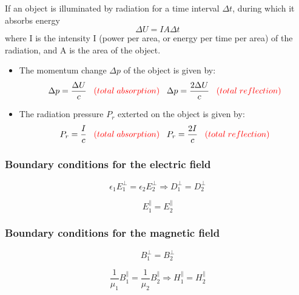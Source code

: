 \documentclass[english,11pt]{article}
\begin{document}
If an object is illuminated by radiation for a time interval ${\Delta}t$,
during which it absorbs energy
\begin{equation*}
  {\Delta}U = IA{\Delta}t
\end{equation*}
where I is the intensity I (power per area, or energy per time
per area) of the radiation, and A is the area of the object.
\begin{itemize}
\item
The momentum change ${\Delta}p$ of the object is given by:
\begin{equation*}
    {\Delta}p = \frac{{\Delta}U}{c}
    \;\;\; {\color{red} \small (total \; absorption)}
    \;\;\;
    {\Delta}p = \frac{2{\Delta}U}{c}
    \;\;\; {\color{red} \small (total \; reflection)}
\end{equation*}
\item
The radiation pressure $P_r$ exterted on the object is given by:
\begin{equation*}
  P_r = \frac{I}{c}
  \;\;\; {\color{red} \small (total \; absorption)}
  \;\;\;
  P_r = \frac{2I}{c}
  \;\;\; {\color{red} \small (total \; reflection)}
\end{equation*}
\end{itemize}

\subsubsection*{\bf Boundary conditions for the electric field}

\begin{equation*}
    \epsilon_1 E_1^{\perp} = \epsilon_2 E_2^{\perp} \Rightarrow
    D_1^{\perp} = D_2^{\perp}
\end{equation*}

\begin{equation*}
    E_1^{\parallel} = E_2^{\parallel}
\end{equation*}

\subsubsection*{\bf Boundary conditions for the magnetic field}

\begin{equation*}
    B_1^{\perp} = B_2^{\perp}
\end{equation*}

\begin{equation*}
    \frac{1}{\mu_1} B_1^{\parallel} = \frac{1}{\mu_2} B_2^{\parallel} \Rightarrow
    H_1^{\parallel} = H_2^{\parallel}
\end{equation*}
\end{document}
